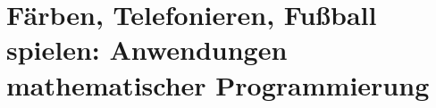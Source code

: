 \chapter{Färben, Telefonieren, Fußball spielen: Anwendungen
  mathematischer Programmierung}
\label{chap_faerbung}
